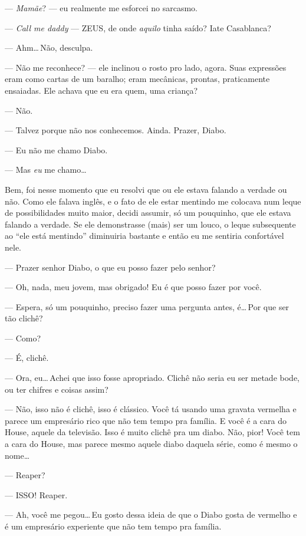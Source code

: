 --- \emph{Mamãe}? --- eu realmente me esforcei no sarcasmo.

--- \emph{Call me daddy} --- ZEUS, de onde \emph{aquilo} tinha saído? Iate Casablanca?

--- Ahm\ldots\,Não, desculpa.

--- Não me reconhece? --- ele inclinou o rosto pro lado, agora. Suas expressões eram como cartas de um baralho; eram mecânicas, prontas, praticamente ensaiadas. Ele achava que eu era quem, uma criança?

--- Não.

--- Talvez porque não nos conhecemos. Ainda. Prazer, Diabo.

--- Eu não me chamo Diabo.

\enlargethispage{\baselineskip}

--- Mas \emph{eu} me chamo\ldots

Bem, foi nesse momento que eu resolvi que ou ele estava falando a verdade ou não. Como ele falava inglês, e o fato de ele estar mentindo me colocava num leque de possibilidades muito maior, decidi assumir, só um pouquinho, que ele estava falando a verdade. Se ele demonstrasse (mais) ser um louco, o leque subsequente ao ``ele está mentindo'' diminuiria bastante e então eu me sentiria confortável nele.

--- Prazer senhor Diabo, o que eu posso fazer pelo senhor?

--- Oh, nada, meu jovem, mas obrigado! Eu é que posso fazer por você.

--- Espera, só um pouquinho, preciso fazer uma pergunta antes, é\ldots\,Por que ser tão clichê?

--- Como?

--- É, clichê.

--- Ora, eu\ldots\,Achei que isso fosse apropriado. Clichê não seria eu ser metade bode, ou ter chifres e coisas assim?

--- Não, isso não é clichê, isso é clássico. Você tá usando uma gravata vermelha e parece um empresário rico que não tem tempo pra família. E você é a cara do House, aquele da televisão. Isso é muito clichê pra um diabo. Não, pior! Você tem a cara do House, mas parece mesmo aquele diabo daquela série, como é mesmo o nome\ldots

--- Reaper?

--- ISSO! Reaper.

--- Ah, você me pegou\ldots\,Eu gosto dessa ideia de que o Diabo gosta de vermelho e é um empresário experiente que não tem tempo pra família.


